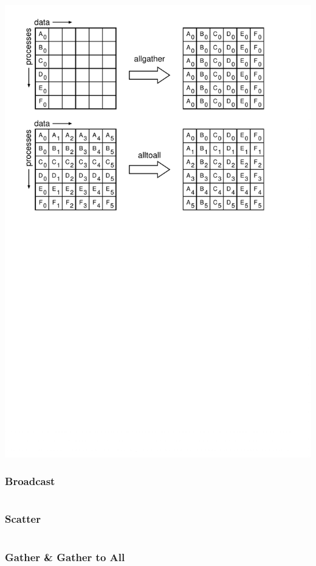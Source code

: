 \begin{frame}
  \includegraphics[scale=0.75]{collectives2.pdf}
\end{frame}

\begin{frame}
  \frametitle{Broadcast}
  \inputminted[linenos]{python}{coll_bcast.py}
\end{frame}

\begin{frame}
  \frametitle{Scatter}
  \inputminted[linenos]{python}{coll_scatter.py}
\end{frame}

\begin{frame}
  \frametitle{Gather \& Gather to All}
  \inputminted[linenos]{python}{coll_gather.py}
\end{frame}

